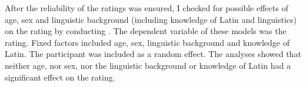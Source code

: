 \begin{table}
	\caption{Overview consistency estimates for all ratings in corpus study}
	\label{tbl:Overview consistency estimates for all ratings in corpus studys}
	
	
\end{table}



After the reliability of the ratings was ensured, I checked for possible effects of age, sex and linguistic background (including knowledge of Latin and linguistics) on the rating by conducting . The dependent variable of these models was the rating. Fixed factors included age, sex, linguistic background and knowledge of Latin. The participant was included as a random effect. The analyses showed that neither age, nor sex,  nor the linguistic background or knowledge of Latin had a significant effect on the rating.

